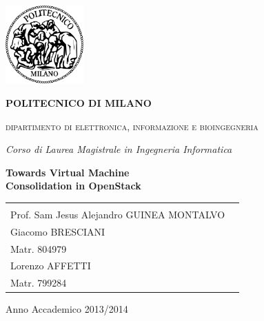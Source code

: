 \begin{titlepage}
 \begin{center}
 \includegraphics[width=3cm]{images/logo_polimi.png}
 {\begin{center}
 \begin{LARGE}
 \textbf{\uppercase{politecnico di milano}}
 \end{LARGE}
 \begin{large}
 \textsc{
 dipartimento di elettronica, informazione e bioingegneria
 }
 \end{large}
 \end{center}
 }
 \vspace*{0.3cm}
 {\Large 
 \emph{Corso di Laurea Magistrale in Ingegneria Informatica\\[1.3cm]}
 }
 \begin{Huge}
 \textbf{Towards Virtual Machine\\[0.4cm]
 Consolidation in OpenStack
 }
 \end{Huge}
 \vfill
 \begin{minipage}{.99\linewidth}
 \begin{tabular}{l r}
 \begin{minipage}{.4\linewidth}
 \begin{flushleft}
 {\large
 RELATORE\\[.3cm]
 Prof. Sam Jesus Alejandro GUINEA MONTALVO
 }
 \end{flushleft}
 \end{minipage}
 &
 \begin{minipage}{.6\linewidth}
 \begin{flushright}
 {\large
 TESI DI LAUREA DI\\[.3cm]
 Giacomo BRESCIANI\\
 Matr. 804979\\[.3cm]
 Lorenzo AFFETTI\\
 Matr. 799284
 }
 \end{flushright}
 \end{minipage}
 \end{tabular}
 \end{minipage}
 \vfill
 {\large{{Anno Accademico 2013/2014}}}
 \end{center}
\end{titlepage}
\cleardoublepage

